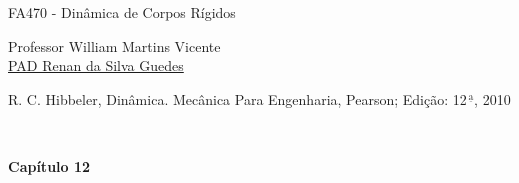 \documentclass[a4paper,12pt]{article}
\begin{document}
	\begin{center}
		\begin{huge}
			FA470 - Dinâmica de Corpos Rígidos\\\vspace{1cm}
		\end{huge}
		\begin{large}
			Professor William Martins Vicente\\\vspace{.5cm}
			\href{https://github.com/renanGuedes10/}{PAD Renan da Silva Guedes}\\\vspace{1cm}
		\end{large}
		\begin{Large}
			R. C. Hibbeler, Dinâmica. Mecânica Para Engenharia, Pearson; Edição: 12$^{\,\underline{\text{a}}}$, 2010
		\end{Large}\\\vspace{1cm}
		\begin{large}
			\textbf{Capítulo 12}
		\end{large}
	\end{center}    
	
\end{document}
